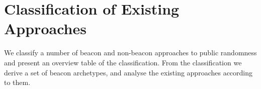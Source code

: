 \section{Classification of Existing Approaches}\label{sec:classification}

We classify a number of beacon and non-beacon approaches to public randomness and present an overview table of the classification. From the classification we derive a set of beacon archetypes, and analyse the existing approaches according to them. 